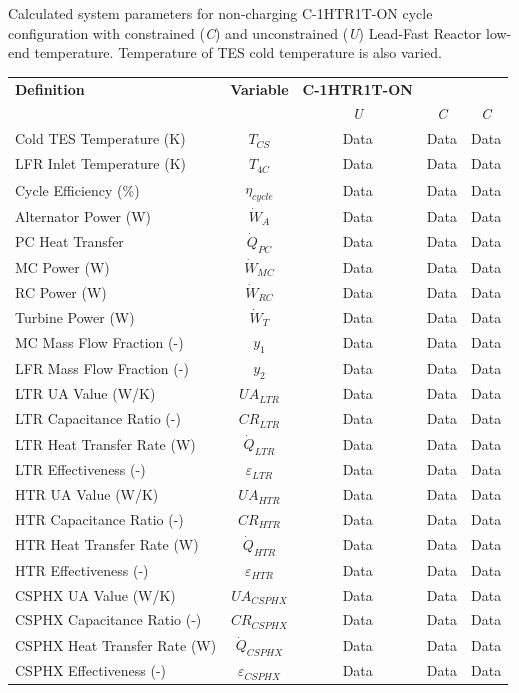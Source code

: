 \begin{paracol}{2}
\begin{specialtable}[H] 
    \caption{Calculated system parameters for non-charging C-1HTR1T-ON cycle configuration with constrained (\textit{C}) and unconstrained (\textit{U}) Lead-Fast Reactor low-end temperature. Temperature of TES cold temperature is also varied.\label{tab-c-1htr1t-on}}
    \begin{tabular}{lcccc}
    \toprule
    \textbf{Definition} & \textbf{Variable} & \textbf{C-1HTR1T-ON}\\
    & & \textit{U} & \textit{C} & \textit{C}\\
    \midrule
    Cold TES Temperature (K)	&	$T_{CS}$	&	Data	&	Data	&	Data	\\
    LFR Inlet Temperature (K)	&	$T_{4C}$	&	Data	&	Data	&	Data	\\
    Cycle Efficiency (\%)	&	$\eta_{cycle}$	&	Data	&	Data	&	Data	\\
    Alternator Power (W)	&	$\dot{W}_{A}$	&	Data	&	Data	&	Data	\\
    PC Heat Transfer	&	$\dot{Q}_{PC}$	&	Data	&	Data	&	Data	\\
    MC Power (W)	&	$\dot{W}_{MC}$	&	Data	&	Data	&	Data	\\
    RC Power (W)	&	$\dot{W}_{RC}$	&	Data	&	Data	&	Data	\\
    Turbine Power (W)	&	$\dot{W}_{T}$	&	Data	&	Data	&	Data	\\
    MC Mass Flow Fraction (-)	&	$y_{1}$	&	Data	&	Data	&	Data	\\
    LFR Mass Flow Fraction (-)	&	$y_{2}$	&	Data	&	Data	&	Data	\\
    LTR UA Value (W/K)	&	$UA_{LTR}$	&	Data	&	Data	&	Data	\\
    LTR Capacitance Ratio (-)	&	$CR_{LTR}$	&	Data	&	Data	&	Data	\\
    LTR Heat Transfer Rate (W)	&	$\dot{Q}_{LTR}$	&	Data	&	Data	&	Data	\\
    LTR Effectiveness (-)	&	$\varepsilon_{LTR}$	&	Data	&	Data	&	Data	\\
    HTR UA Value (W/K)	&	$UA_{HTR}$	&	Data	&	Data	&	Data	\\
    HTR Capacitance Ratio (-)	&	$CR_{HTR}$	&	Data	&	Data	&	Data	\\
    HTR Heat Transfer Rate (W)	&	$\dot{Q}_{HTR}$	&	Data	&	Data	&	Data	\\
    HTR Effectiveness (-)	&	$\varepsilon_{HTR}$	&	Data	&	Data	&	Data	\\
    CSPHX UA Value (W/K)	&	$UA_{CSPHX}$	&	Data	&	Data	&	Data	\\
    CSPHX Capacitance Ratio (-)	&	$CR_{CSPHX}$	&	Data	&	Data	&	Data	\\
    CSPHX Heat Transfer Rate (W)	&	$\dot{Q}_{CSPHX}$	&	Data	&	Data	&	Data	\\
    CSPHX Effectiveness (-)	&	$\varepsilon_{CSPHX}$	&	Data	&	Data	&	Data	\\
    \bottomrule
    \end{tabular}\\
\end{specialtable}


\end{paracol}
